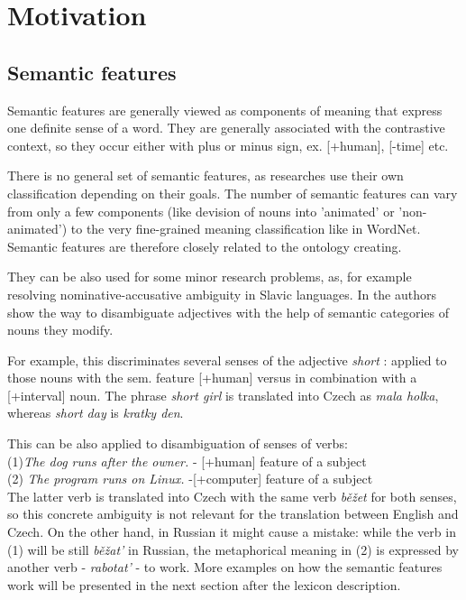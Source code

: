 \documentclass[letterpaper]{article}
\begin{document}
\section{Motivation}
\subsection{Semantic features}
Semantic features are generally viewed as components of meaning
that express one definite sense of a word. They are generally associated
with the contrastive context, so they occur either with plus or minus
sign, ex. [+human], [-time] etc.

There is no general set of semantic features, as researches
use their own classification depending on their goals. The
number of semantic features can vary from only a few components (like
devision of nouns into 'animated' or 'non-animated') to the very
fine-grained meaning classification like in WordNet. Semantic features
are therefore closely related to the ontology creating.

They can be also used for some minor research problems, as, for example
resolving nominative-accusative ambiguity in Slavic languages.
In \cite{principled_disam} the authors show the way to disambiguate adjectives
with the help of semantic categories of nouns they modify. 

For example, 
this discriminates several senses of the  adjective \textit{short}
: applied to those nouns with the sem. feature [+human] versus in combination
with a [+interval] noun. The phrase \textit{short girl} is translated
into Czech as \textit{mala holka}, whereas \textit{short day} is \textit{kratky den}.

This can be also applied to disambiguation of senses of verbs:\\ 
(1)\textit{The dog runs after the owner.} - [+human] feature of a subject\\
(2) \textit{The program runs on Linux.} -[+computer] feature of a subject \\
The latter verb is translated into Czech with the same verb \textit{běžet}
for both senses, so this concrete ambiguity is not relevant for
the translation between English and Czech. On the other hand, in Russian
it might cause a mistake: while the verb in (1) will be still \textit{běžat'} in Russian,
the metaphorical meaning in (2) is expressed by another verb - \textit{rabotat'} - to work.
More examples on how the semantic features work will be presented in the next section
after the lexicon description.
\end{document}
